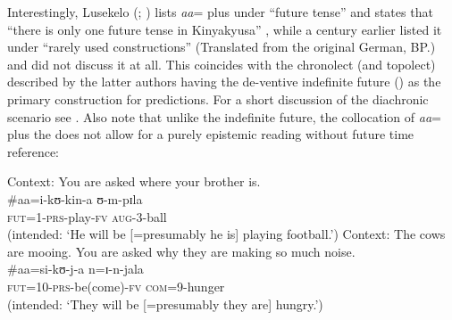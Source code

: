 Interestingly, Lusekelo (\citeyear{LusekeloA2007}; \citeyear{LusekeloA2013}) lists \textit{aa}= plus  under ``future tense'' and states that ``there is only one future tense in Kinyakyusa'' \citep[109]{LusekeloA2013}, while a century earlier \citet[32]{SchumannK1899} listed it under ``rarely used constructions'' (Translated from the original German, BP.) and \citet{EndemannC1914} did not discuss it at all. This coincides with the chronolect (and topolect) described by the latter authors having the de-ventive indefinite future () as the primary construction for predictions. For a short discussion of the diachronic scenario see . Also note that unlike the indefinite future, the collocation of \textit{aa}= plus the  does not allow for a purely epistemic reading without future time reference:
\clearpage
\begin{exe}
\ex Context: You are asked where your brother is.\\
\gll \#aa=i-kʊ-kin-a ʊ-m-pɪla\\
\phantom{\#}\textsc{fut}=1-\textsc{prs}-play-\textsc{fv} \textsc{aug}-3-ball\\
\glt \makebox[\myl][l]{}(intended: \lq He will be [=presumably he is] playing football.')
\ex Context: The cows are mooing. You are asked why they are making so much noise.\\
\gll \#aa=si-kʊ-j-a n=ɪ-n-jala\\
\phantom{\#}\textsc{fut}=10-\textsc{prs}-be(come)-\textsc{fv} \textsc{com}=9-hunger\\
\glt \makebox[\myl][l]{}(intended: \lq They will be [=presumably they are] hungry.')
\end{exe} %

